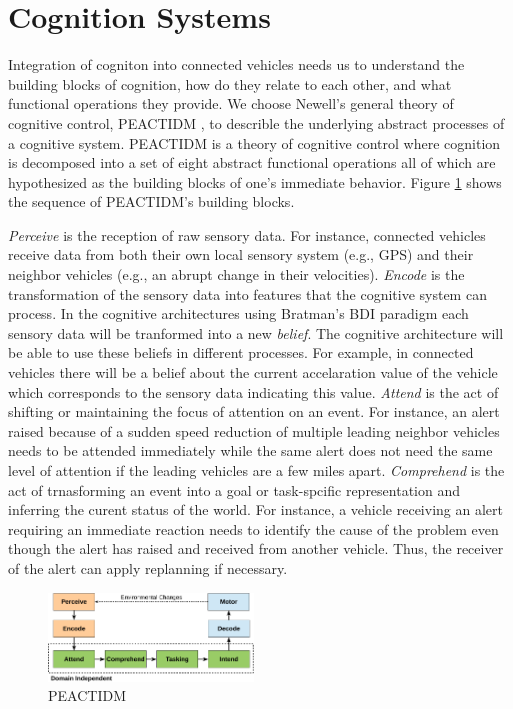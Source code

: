 \documentclass[journal, 11pt]{IEEEtran}
\begin{document}
\section{Cognition Systems}

Integration of cogniton into connected vehicles needs us to understand the
building blocks of cognition, how do they relate to each other, and what
functional operations they provide. We choose Newell's general theory of
cognitive control, PEACTIDM \cite{newell:unified-cognition}, to describle the
underlying abstract processes of a cognitive system. PEACTIDM is a theory of
cognitive control where cognition is decomposed into a set of eight abstract
functional operations \cite{newell:unified-cognition} all of which are
hypothesized as the building blocks of one's immediate behavior. Figure
\ref{fig:peactidm} shows the sequence of PEACTIDM's building blocks.

\textit{Perceive} is the reception of raw sensory data. For instance, connected
vehicles receive data from both their own local sensory system (e.g., GPS) and
their neighbor vehicles (e.g., an abrupt change in their velocities).
\textit{Encode} is the transformation of the sensory data into features that the
cognitive system can process. In the cognitive architectures using Bratman's BDI
paradigm \cite{bratman:intentions-plans} each sensory data will be tranformed
into a new \textit{belief}. The cognitive architecture will be able to use these
beliefs in different processes. For example, in connected vehicles there will be
a belief about the current accelaration value of the vehicle which corresponds
to the sensory data indicating this value. \textit{Attend} is the act of
shifting or maintaining the focus of attention on an event. For instance, an
alert raised because of a sudden speed reduction of multiple leading neighbor
vehicles needs to be attended immediately while the same alert does not need the
same level of attention if the leading vehicles are a few miles apart.
\textit{Comprehend} is the act of trnasforming an event into a goal or
task-spcific representation and inferring the curent status of the world. For
instance, a vehicle receiving an alert requiring an immediate reaction needs to
identify the cause of the problem even though the alert has raised and received
from another vehicle. Thus, the receiver of the alert can apply replanning if
necessary.

\begin{figure}[!t]
  \centering
  \includegraphics[width=0.485\textwidth]{figs/peactidm-croped.pdf}
  \caption{{\fontsize{10}{10}\selectfont PEACTIDM}}
  \label{fig:peactidm}
  \vspace*{-6mm}
\end{figure}
\end{document}
